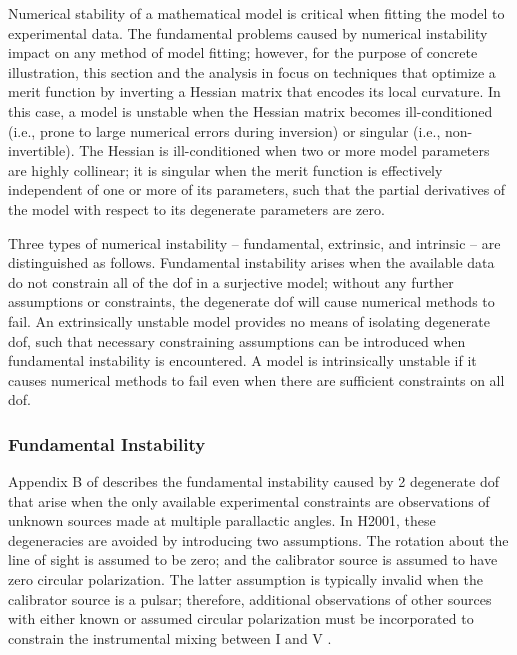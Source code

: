 Numerical stability of a mathematical model is critical when fitting the model to experimental data.
%
The fundamental problems caused by numerical instability impact on any method of model fitting; however, for the purpose of concrete illustration, this section and the analysis in  focus on  
techniques that optimize a merit function by inverting a Hessian matrix that encodes its local curvature.
%
In this case, a model is unstable when the Hessian matrix becomes ill-conditioned
(i.e., prone to large numerical errors during inversion) or singular
(i.e., non-invertible).
%
The Hessian is ill-conditioned when two or more model parameters are highly
collinear; it is singular when the merit function is effectively independent of one or more
of its parameters, such that the partial derivatives of the model 
with respect to its degenerate parameters are zero.


Three types of numerical instability --
fundamental, extrinsic, and intrinsic --
are distinguished as follows.
%
Fundamental instability arises when the available data
do not constrain all of the dof in a surjective model; 
without any further assumptions or constraints, 
the degenerate dof will cause numerical methods to fail.
%
An extrinsically unstable model provides no means
of isolating degenerate dof, such that necessary constraining assumptions can be introduced when fundamental instability is encountered.
%
A model is intrinsically unstable if it causes numerical methods to fail even when there are sufficient constraints on all dof.
%

\subsubsection{Fundamental Instability}

Appendix B of \citet{van04c} describes the fundamental instability
caused by 2 degenerate dof that arise when the only available
experimental constraints are observations of unknown sources made 
at multiple parallactic angles.
%
In H2001, these degeneracies are avoided by introducing two assumptions. 
The rotation about the line of sight is assumed to be zero; 
and the calibrator source is assumed to have zero circular polarization.
%
The latter assumption is typically invalid when the calibrator source
is a pulsar; therefore, additional observations of other sources with
either known or assumed circular polarization must be incorporated to
constrain the instrumental mixing between I and V \cite[e.g.,][]{lck+16}.

